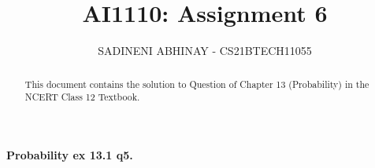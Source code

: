 \documentclass[journal,12pt,twocolumn]{IEEEtran}
\begin{document}
	
	
	\providecommand{\mbf}{\mathbf}
	\providecommand{\pr}[1]{\ensuremath{\Pr\left(#1\right)}}
	\providecommand{\qfunc}[1]{\ensuremath{Q\left(#1\right)}}
	\providecommand{\sbrak}[1]{\ensuremath{{}\left[#1\right]}}
	\providecommand{\lsbrak}[1]{\ensuremath{{}\left[#1\right.}}
	\providecommand{\rsbrak}[1]{\ensuremath{{}\left.#1\right]}}
	\providecommand{\brak}[1]{\ensuremath{\left(#1\right)}}
	\providecommand{\lbrak}[1]{\ensuremath{\left(#1\right.}}
	\providecommand{\rbrak}[1]{\ensuremath{\left.#1\right)}}
	\providecommand{\cbrak}[1]{\ensuremath{\left\{#1\right\}}}
	\providecommand{\lcbrak}[1]{\ensuremath{\left\{#1\right.}}
	\providecommand{\rcbrak}[1]{\ensuremath{\left.#1\right\}}}
	\providecommand{\dec}[2]{\ensuremath{\overset{#1}{\underset{#2}{\gtrless}}}}
	\newcommand{\myvec}[1]{\ensuremath{\begin{pmatrix}#1\end{pmatrix}}}
	\newcommand{\mydet}[1]{\ensuremath{\begin{vmatrix}#1\end{vmatrix}}}
	\newcommand*{\permcomb}[4][0mu]{{{}^{#3}\mkern#1#2_{#4}}}
	\newcommand*{\perm}[1][-3mu]{\permcomb[#1]{P}}
	\newcommand*{\comb}[1][-1mu]{\permcomb[#1]{C}}
	\title{
		AI1110: Assignment 6
	}
	\author{
		SADINENI ABHINAY - CS21BTECH11055
	}
	
	\maketitle
	\begin{abstract}
		This document contains the solution to Question of Chapter 13 (Probability) in the NCERT Class 12 Textbook.
	\end{abstract}
	
	\textbf{Probability  ex 13.1 q5.}
\end{document}
